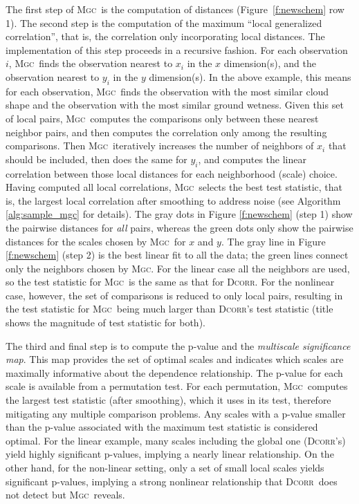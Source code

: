 \documentclass[11pt]{article}
\providecommand{\sct}[1]{{\normalfont\textsc{#1}}}
\newcommand{\Mgc}{\sct{Mgc}}
\newcommand{\Dcorr}{\sct{Dcorr}}
\begin{document}
The first step of \Mgc~is the computation of distances (Figure~\ref{f:newschem} row 1). The second step is the computation of the maximum ``local generalized correlation'', that is, the correlation only incorporating local distances.
The implementation of this step proceeds in a recursive fashion.  For each observation $i$, \Mgc~finds the observation nearest to $x_i$ in the $x$ dimension(s), and the observation nearest to $y_i$ in the $y$ dimension(s). 
In the above example, this means for each observation, \Mgc~finds the observation with the most similar cloud shape and the observation with the most similar ground wetness.  
Given this set of local pairs, \Mgc~computes the comparisons only between these nearest neighbor pairs, and then computes the correlation only among the resulting comparisons.  
Then \Mgc~iteratively increases the number of neighbors of $x_i$ that should be included, then does the same for $y_i$, and computes the linear correlation between those local distances for each neighborhood (scale) choice.   
Having computed all local correlations, \Mgc~selects the best test statistic, that is, the largest local correlation after smoothing to address noise (see Algorithm \ref{alg:sample_mgc} for details). 
The gray dots in Figure \ref{f:newschem} (step 1) show the pairwise distances for \emph{all} pairs, whereas the green dots only show the pairwise distances for the scales chosen by \Mgc~for $x$ and $y$.  The gray line in Figure \ref{f:newschem} (step 2) is the best linear fit to all the data; the green lines connect only the neighbors chosen by \Mgc. For the linear case all the neighbors are used, so the test statistic for \Mgc~is the same as that for \Dcorr.  For the nonlinear case, however, the set of comparisons is reduced to only local pairs, resulting in the test statistic for \Mgc~being much larger than \Dcorr's test statistic (title shows the magnitude of test statistic for both).   

The third and final step is to compute the p-value and the \emph{multiscale significance map}. This map provides the set of optimal scales and indicates which scales are maximally informative about the dependence relationship. The p-value for each scale is available from a permutation test.  For each permutation, \Mgc~computes the largest test statistic (after smoothing), which it uses in its test, therefore mitigating any multiple comparison problems.  Any scales with a p-value smaller than the p-value associated with the maximum test statistic is considered optimal.  
For the linear example, many scales including the global one (\Dcorr's) yield highly significant p-values, implying a nearly linear relationship.
On the other hand, for the non-linear setting, only a set of small local scales yields significant p-values, implying a strong nonlinear relationship that \Dcorr~does not detect but \Mgc~reveals.  
\end{document}
